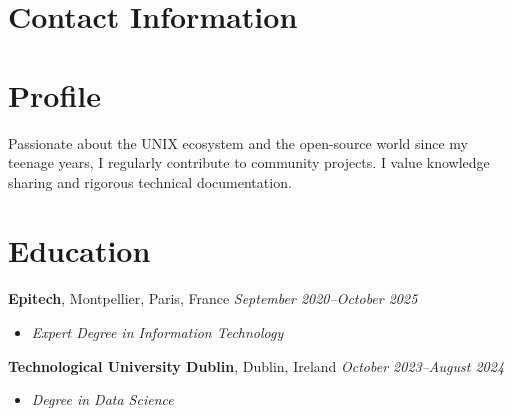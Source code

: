 \documentclass[margin,line]{../res}
\begin{document}
\newcommand{\myname}{Théo BORI}
\newlength{\mynamewidth}
\settowidth{\mynamewidth}{\namefont\myname}

\name{\hspace*{0.5\textwidth}\hspace{-0.5\mynamewidth} \myname \vspace*{.1in}}
\thispagestyle{empty}

\begin{resume}

  \section{\sc Contact Information}
  

  \vspace{-1em}

  \section{\sc Profile}
  Passionate about the UNIX ecosystem and the open-source world since
  my teenage years, I regularly contribute to community projects. I value
  knowledge sharing and rigorous technical documentation.

  \section{\sc Education}
  {\bf Epitech}, Montpellier, Paris, France
  \hfill {\it September 2020--October 2025}
  \vspace*{.05in}
  \begin{itemize}
    \item {\it Expert Degree in Information Technology}
  \end{itemize}

  {\bf Technological University Dublin}, Dublin, Ireland
  \hfill {\it October 2023--August 2024}
  \vspace*{.05in}
  \begin{itemize}
    \item {\it Degree in Data Science}
  \end{itemize}


\end{resume}
\end{document}
